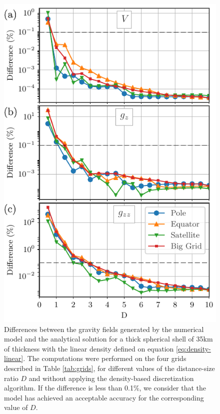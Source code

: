 \documentclass[extra]{gji}
\begin{document}
\begin{figure}
\centering
\includegraphics[width=0.9\linewidth]{figures/linear-D-thick.pdf}
\caption{
    Differences between the gravity fields generated by the numerical 
    model and the analytical solution for a thick spherical shell of 
    35km of thickness with the linear density defined on equation 
    \ref{eq:density-linear}.
    The computations were performed on the four grids described in 
    Table \ref{tab:grids}, for different values of the distance-size 
    ratio $D$ and without applying the density-based discretization 
    algorithm.
    If the difference is less than 0.1\%, we consider that the model 
    has achieved an acceptable accuracy for the corresponding value of 
    $D$.
    }
\label{fig:D-linear-thick}
\end{figure}


\end{document}
